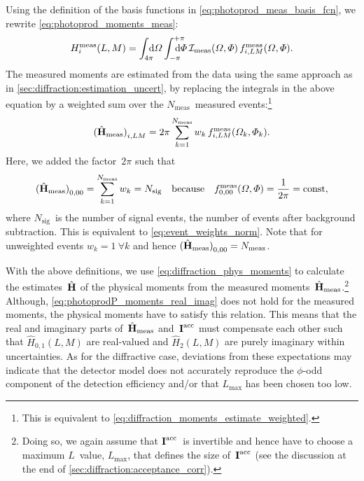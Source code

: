 Using the definition of the basis functions in
\cref{eq:photoprod_meas_basis_fcn}, we rewrite
\cref{eq:photoprod_moments_meas}:
\begin{equation}
  H_i^\text{meas}(L, M)
  = \int_{4 \pi}\!\!\!\! \dif{\Omega} \int_{-\pi}^{+\pi}\hspace{-1.2em} \dif{\Phi}\,
  \intensity_\text{meas}(\Omega, \Phi)\, f_{i, L M}^\text{meas}(\Omega, \Phi).
\end{equation}
The measured moments are estimated from the data using the same
approach as in \cref{sec:diffraction:estimation_uncert}, \ie by
replacing the integrals in the above equation by a weighted sum over
the $N_\text{meas}$~measured events:\footnote{This is equivalent to
\cref{eq:diffraction_moments_estimate_weighted}.}
\begin{equation}
  \label{eq:photoprod_moments_meas_estimate_weighted}
  \rBrk[0]{\hat{\vect{H}}_\text{meas}}_{i, L M}
  = 2 \pi \sum_{k = 1}^{N_\text{meas}} w_k\, f_{i, L M}^\text{meas}(\Omega_k, \Phi_k).
\end{equation}
Here, we added the factor~$2 \pi$ such that
\begin{equation}
  \label{eq:photoprod_norm_00}
  \rBrk[0]{\hat{\vect{H}}_\text{meas}}_{0, 0 0}
  = \sum_{k = 1}^{N_\text{meas}} w_k
  = N_\text{sig}
  \quad\text{because}\quad
  f_{0, 0 0}^\text{meas}(\Omega, \Phi)
  = \frac{1}{2 \pi}
  = \text{const},
\end{equation}
where $N_\text{sig}$~is the number of signal events, \ie the number of
events after background subtraction.  This is equivalent to
\cref{eq:event_weights_norm}.  Note that for unweighted events $w_k =
1~ \forall k$ and hence $\rBrk[0]{\hat{\vect{H}}_\text{meas}}_{0, 0 0}
= N_\text{meas}$.

With the above definitions, we use \cref{eq:diffraction_phys_moments}
to calculate the estimates~$\hat{\bm{\mathrm{H}}}$ of the physical moments
from the measured moments~$\hat{\bm{\mathrm{H}}}_\text{meas}$.\footnote{Doing
so, we again assume that $\bm{\mathrm{I}}^\text{acc}$~is invertible and hence
have to choose a maximum $L$~value, $L_\text{max}$, that defines the
size of~$\bm{\mathrm{I}}^\text{acc}$ (see the discussion at the end of
\cref{sec:diffraction:acceptance_corr}).}  Although,
\cref{eq:photoprodP_moments_real_imag} does not hold for the measured
moments, the physical moments have to satisfy this relation.  This
means that the real and imaginary parts
of~$\hat{\bm{\mathrm{H}}}_\text{meas}$ and~$\bm{\mathrm{I}}^\text{acc}$ must
compensate each other such that $\hat{H}_{0, 1}(L, M)$ are real-valued
and $\hat{H}_2(L, M)$ are purely imaginary within uncertainties.  As
for the diffractive case, deviations from these expectations may
indicate that the detector model does not accurately reproduce the
$\phi$-odd component of the detection efficiency and/or that
$L_\text{max}$ has been chosen too low.

